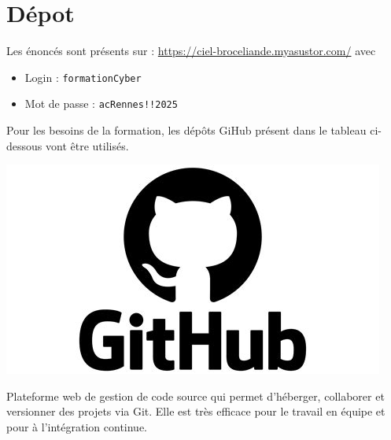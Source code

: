 \documentclass[french, 12pt]{article}%
\newcommand{\itemE}{\item[$\bullet$]}
\newcommand{\titreencadre}{Titre}
\newenvironment{encadre}[1]{\renewcommand{\titreencadre}{#1}
	\begin{mdframed}[style=encadrestyle]
	\vspace{0.5\baselineskip}
	}{%
	\end{mdframed}}
\begin{document}
\section{Dépot}

Les énoncés sont présents sur : 
\url{https://ciel-broceliande.myasustor.com/}
avec
\begin{itemize}
\itemE Login : \verb?formationCyber?
\itemE Mot de passe : \verb?acRennes!!2025?
\end{itemize}


\begin{minipage}{0.65\linewidth}
Pour les besoins de la formation, les dépôts GiHub présent dans le tableau ci-dessous vont être utilisés.
\end{minipage}
\begin{minipage}{0.34\linewidth}
\begin{center}
\includegraphics[scale=0.25]{./ressource/logoGit.jpeg}
\end{center}
\end{minipage}




\begin{encadre}{GitHub }
Plateforme web de gestion de code source qui permet d'héberger, collaborer et versionner des projets via Git. Elle est très efficace pour le travail en équipe et pour à l’intégration continue.
\end{encadre}
\end{document}
